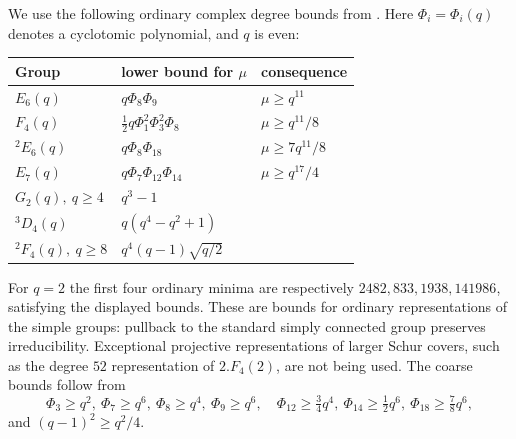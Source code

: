\documentclass[11pt]{article}
\theoremstyle{definition}
\begin{document}
We use the following ordinary complex degree bounds from \cite[Theorem 2.1 and Sections 5.3--5.10]{Lubeck}. Here $\Phi_i=\Phi_i(q)$ denotes a cyclotomic polynomial, and $q$ is even:
\begin{center}\small
\begin{tabular}{lll}
\toprule
Group & lower bound for $\mu$ & consequence\\
\midrule
$E_6(q)$ & $q\Phi_8\Phi_9$ & $\mu\ge q^{11}$\\
$F_4(q)$ & $\tfrac12q\Phi_1^2\Phi_3^2\Phi_8$ & $\mu\ge q^{11}/8$\\
$^2E_6(q)$ & $q\Phi_8\Phi_{18}$ & $\mu\ge7q^{11}/8$\\
$E_7(q)$ & $q\Phi_7\Phi_{12}\Phi_{14}$ & $\mu\ge q^{17}/4$\\
$G_2(q),\ q\ge4$ & $q^3-1$ & \\
$^3D_4(q)$ & $q(q^4-q^2+1)$ & \\
$^2F_4(q),\ q\ge8$ & $q^4(q-1)\sqrt{q/2}$ & \\
\bottomrule
\end{tabular}
\end{center}
For $q=2$ the first four ordinary minima are respectively $2482,833,1938,141986$, satisfying the displayed bounds. These are bounds for ordinary representations of the simple groups: pullback to the standard simply connected group preserves irreducibility. Exceptional projective representations of larger Schur covers, such as the degree $52$ representation of $2.F_4(2)$, are not being used. The coarse bounds follow from
\[
\Phi_3\ge q^2,\ \Phi_7\ge q^6,\ \Phi_8\ge q^4,\ \Phi_9\ge q^6,\quad
\Phi_{12}\ge\tfrac34q^4,\ \Phi_{14}\ge\tfrac12q^6,\
\Phi_{18}\ge\tfrac78q^6,
\]
and $(q-1)^2\ge q^2/4$.
\end{document}
